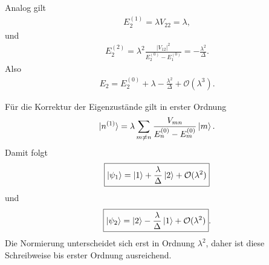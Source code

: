 \documentclass[11pt,a4paper]{scrartcl}
\newcommand{\abs}[1]{\left| #1 \right|}
\begin{document}
\begin{enumerate}[label=(\alph*)]
\begin{calculationbox}
            \begin{calculationbox}[title=Energie von Zustand $\ket{2}$]
                Analog gilt
                \begin{align*}
                    E_2^{(1)}
                    =
                    \lambda V_{22}
                    =
                    \lambda,
                \end{align*}
                und
                \begin{align*}
                    E_2^{(2)}
                    =
                    \lambda^2
                    \frac{\abs{V_{12}}^2}{E_2^{(0)}-E_1^{(0)}}
                    =
                    -\frac{\lambda^2}{\Delta}.
                \end{align*}
                Also
                \begin{align*}
                    \boxed{
                    E_2
                    =
                    E_2^{(0)}+\lambda-\frac{\lambda^2}{\Delta}
                    +\mathcal O(\lambda^3)}.
                \end{align*}
            \end{calculationbox}

            \begin{calculationbox}[title=Eigenzustände bis erster Ordnung]
                Für die Korrektur der Eigenzustände gilt in erster Ordnung
                \begin{align*}
                    \ket{n^{(1)}}
                    =
                    \lambda
                    \sum_{m\neq n}
                    \frac{V_{mn}}{E_n^{(0)}-E_m^{(0)}}\ket{m}.
                \end{align*}
                Damit folgt
                \begin{align*}
                    \boxed{
                    \ket{\psi_1}
                    =
                    \ket{1}
                    +
                    \frac{\lambda}{\Delta}\ket{2}
                    +\mathcal O(\lambda^2)}
                \end{align*}
                und
                \begin{align*}
                    \boxed{
                    \ket{\psi_2}
                    =
                    \ket{2}
                    -
                    \frac{\lambda}{\Delta}\ket{1}
                    +\mathcal O(\lambda^2)}.
                \end{align*}
                Die Normierung unterscheidet sich erst in Ordnung $\lambda^2$, daher ist diese Schreibweise bis erster Ordnung ausreichend.
            \end{calculationbox}


\end{calculationbox}
\end{enumerate}
\end{document}
